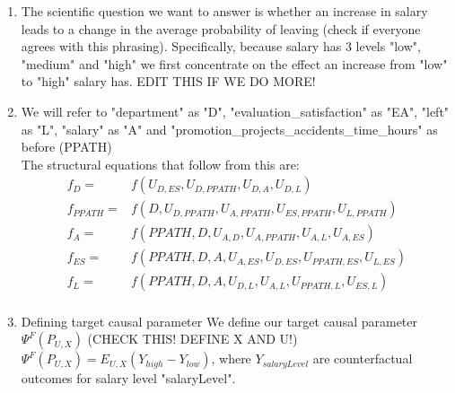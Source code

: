 \documentclass[11pt]{article} %
\begin{document}
\begin{enumerate}
\item
The scientific question we want to answer is whether an increase in salary leads to a change in the average probability of leaving (check if everyone agrees with this phrasing).  Specifically, because salary has 3 levels "low", "medium" and "high" we  first concentrate on the effect an increase from "low" to "high" salary has. EDIT THIS IF WE DO MORE!\\

\item
We will refer to "department" as "D", "evaluation\_satisfaction" as "EA", "left" as "L", "salary" as "A" and "promotion\_projects\_accidents\_time\_hours" as before (PPATH)\\
The structural equations that follow from this are:
\begin{align*}
f_{D} =& f(U_{D,ES}, U_{D,PPATH}, U_{D,A}, U_{D,L})\\
f_{PPATH} =& f(D,U_{D,PPATH}, U_{A,PPATH}, U_{ES, PPATH}, U_{L,PPATH})\\
f_{A} =& f(PPATH, D, U_{A,D}, U_{A,PPATH}, U_{A,L}, U_{A,ES})\\
f_{ES} =& f(PPATH, D, A, U_{A,ES}, U_{D,ES}, U_{PPATH,ES}, U_{L,ES})\\
f_{L} =& f(PPATH, D, A, U_{D,L}, U_{A,L}, U_{PPATH,L},U_{ES,L})\\
\end{align*}


\item Defining target causal parameter
We define our target causal parameter $\Psi^F(P_{U,X})$ (CHECK THIS! DEFINE X AND U!)\\
 $\Psi^F(P_{U,X}) = E_{U,X}(Y_{high} - Y_{low})$, where $Y_{salaryLevel}$ are counterfactual outcomes for salary level "salaryLevel".\\

\end{enumerate}
\end{document}
